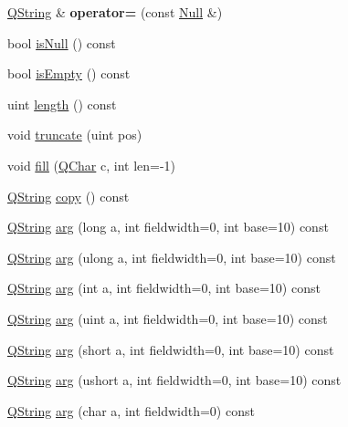 \begin{DoxyCompactItemize}
\item 
\hypertarget{class_q_string_a141b2002462511d59cf43cdc27237bac}{\hyperlink{class_q_string}{Q\-String} \& {\bfseries operator=} (const \hyperlink{struct_q_string_1_1_null}{Null} \&)}\label{class_q_string_a141b2002462511d59cf43cdc27237bac}

\item 
bool \hyperlink{class_q_string_ac02f2a4d7312eb91f40980adfd4e31b2}{is\-Null} () const 
\item 
bool \hyperlink{class_q_string_a479432127ee77145cc19d6a2d1590821}{is\-Empty} () const 
\item 
uint \hyperlink{class_q_string_ab0edbf251efc0562d70132e931e3cf06}{length} () const 
\item 
void \hyperlink{class_q_string_aebc5eed775112beb78fc3255d3dd70b1}{truncate} (uint pos)
\item 
void \hyperlink{class_q_string_add279e13ff7df6ca8650e7d7fa6afc14}{fill} (\hyperlink{class_q_char}{Q\-Char} c, int len=-\/1)
\item 
\hyperlink{class_q_string}{Q\-String} \hyperlink{class_q_string_a54e55577945c7f93818f5ceba792dc5a}{copy} () const 
\item 
\hyperlink{class_q_string}{Q\-String} \hyperlink{class_q_string_a4adcdaef1eca41a976263df7f5aa216f}{arg} (long a, int fieldwidth=0, int base=10) const 
\item 
\hyperlink{class_q_string}{Q\-String} \hyperlink{class_q_string_ae7d16a0a79390b116b8d51795aab1f86}{arg} (ulong a, int fieldwidth=0, int base=10) const 
\item 
\hyperlink{class_q_string}{Q\-String} \hyperlink{class_q_string_a97470b756bd340018edb6391f31baed7}{arg} (int a, int fieldwidth=0, int base=10) const 
\item 
\hyperlink{class_q_string}{Q\-String} \hyperlink{class_q_string_a11febd14403c92b70ec926a81aece5ff}{arg} (uint a, int fieldwidth=0, int base=10) const 
\item 
\hyperlink{class_q_string}{Q\-String} \hyperlink{class_q_string_a5173d8f86476978ae4ecd8cc4fa62154}{arg} (short a, int fieldwidth=0, int base=10) const 
\item 
\hyperlink{class_q_string}{Q\-String} \hyperlink{class_q_string_a335c0cd9985bffad337eee970eb77486}{arg} (ushort a, int fieldwidth=0, int base=10) const 
\item 
\hyperlink{class_q_string}{Q\-String} \hyperlink{class_q_string_a882331b21bc422cda18472f6f2a455b0}{arg} (char a, int fieldwidth=0) const 
\item 

\end{DoxyCompactItemize}
